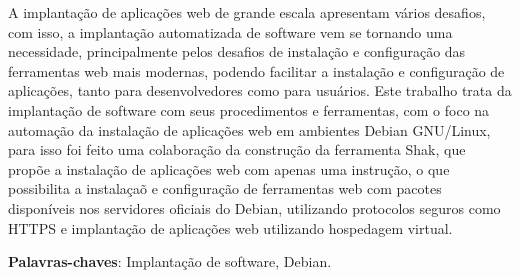 \begin{resumo}

A implantação de aplicações web de grande escala apresentam vários desafios, com
isso, a implantação automatizada de software vem se tornando uma necessidade,
principalmente pelos desafios de instalação e configuração das ferramentas web
mais modernas, podendo facilitar a instalação e configuração de aplicações, tanto para
desenvolvedores como para usuários. Este trabalho trata da implantação de software
com seus procedimentos e ferramentas, com o foco na automação da instalação de 
aplicações web em ambientes Debian GNU/Linux, para isso foi feito uma colaboração da
construção da ferramenta Shak, que propõe a instalação de aplicações web com
apenas uma instrução, o que possibilita a instalaçaõ e configuração de ferramentas
web com pacotes disponíveis nos servidores oficiais do Debian, utilizando
protocolos seguros como HTTPS e implantação de aplicações web utilizando hospedagem virtual.
 \vspace{\onelineskip}

 \noindent
 \textbf{Palavras-chaves}: Implantação de software, Debian.
\end{resumo}
